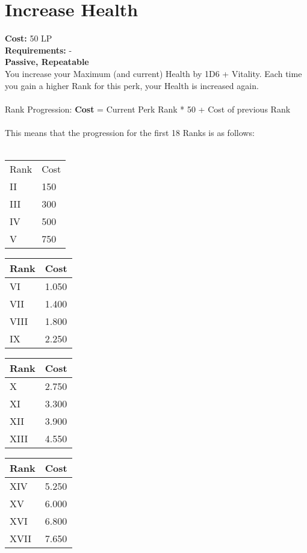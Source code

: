 \section{Increase Health}\label{perk:increasehealth}
\textbf{Cost:} 50 LP\\
\textbf{Requirements:} -\\
\textbf{Passive, Repeatable}\\
You increase your Maximum (and current) Health by 1D6 + Vitality.
Each time you gain a higher Rank for this perk, your Health is increased again.\\
\\
Rank Progression: \textbf{Cost} = Current Perk Rank * 50 + Cost of previous Rank\\
\\
This means that the progression for the first 18 Ranks is as follows:\\
\\
\begin{minipage}{0.25\textwidth}
    \begin{tabular}{l | l}
        Rank & Cost\\
        II & 150\\
        III & 300\\
        IV & 500\\
        V & 750\\
    \end{tabular}
\end{minipage}
\begin{minipage}{0.25\textwidth}
    \begin{tabular}{l | l}
        Rank & Cost\\ \hline
        VI & 1.050\\
        VII & 1.400\\
        VIII & 1.800\\
        IX & 2.250\\
    \end{tabular}
\end{minipage}
\begin{minipage}{0.25\textwidth}
    \begin{tabular}{l | l}
        Rank & Cost\\ \hline
        X & 2.750\\
        XI & 3.300\\
        XII & 3.900\\
        XIII & 4.550\\
    \end{tabular}
\end{minipage}
\begin{minipage}{0.25\textwidth}
    \begin{tabular}{l | l}
        Rank & Cost\\ \hline
        XIV & 5.250\\
        XV & 6.000\\
        XVI & 6.800\\
        XVII & 7.650\\
    \end{tabular}
\end{minipage}